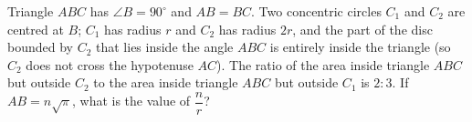 Triangle $ABC$ has $\angle B=90^\circ$ and $AB=BC$. Two concentric circles $C_1$ and $C_2$ are centred at $B$; $C_1$ has radius $r$ and $C_2$ has radius $2r$, and the part of the disc bounded by $C_2$ that lies inside the angle $ABC$ is entirely inside the triangle (so $C_2$ does not cross the hypotenuse $AC$). The ratio of the area inside triangle $ABC$ but outside $C_2$ to the area inside triangle $ABC$ but outside $C_1$ is $2:3$. If $AB=n\sqrt\pi$, what is the value of $\dfrac nr$?
